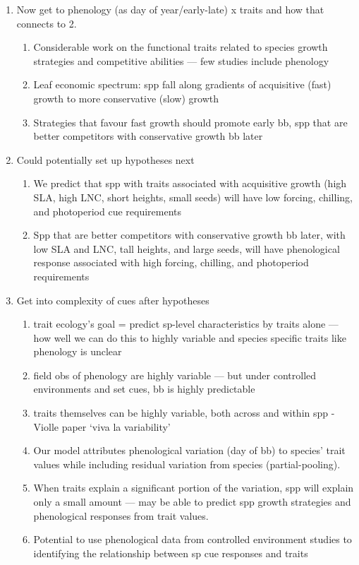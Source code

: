 \documentclass{article}
\begin{document}
\begin{enumerate}
\item Now get to phenology (as day of year/early-late) x traits and how that connects to 2.
\begin{enumerate}
\item Considerable work on the functional traits related to species growth strategies and competitive abilities — few studies include phenology
\item Leaf economic spectrum: spp fall along gradients of acquisitive (fast) growth to more conservative (slow) growth
\item Strategies that favour fast growth should promote early bb, spp that are better competitors with conservative growth bb later
\end{enumerate}

\item Could potentially set up hypotheses next
\begin{enumerate}
\item We predict that spp with traits associated with acquisitive growth (high SLA, high LNC, short heights, small seeds) will have low forcing, chilling, and photoperiod cue requirements
\item Spp that are better competitors with conservative growth bb later, with low SLA and LNC, tall heights, and large seeds, will have phenological response associated with high forcing, chilling, and photoperiod requirements
\end{enumerate}

\item Get into complexity of cues after hypotheses
\begin{enumerate}
\item trait ecology’s goal = predict sp-level characteristics by traits alone — how well we can do this to highly variable and species specific traits like phenology is unclear
\item field obs of phenology are highly variable — but under controlled environments and set cues, bb is highly predictable
\item traits themselves can be highly variable, both across and within spp - Violle paper ‘viva la variability’
\item Our model attributes phenological variation (day of bb) to species’ trait values while including residual variation from species (partial-pooling).
\item When traits explain a significant portion of the variation, spp will explain only a small amount — may be able to predict spp growth strategies and phenological responses from trait values.
\item Potential to use phenological data from controlled environment studies to identifying the relationship between sp cue responses and traits
\end{enumerate}


\end{enumerate}
\end{document}
